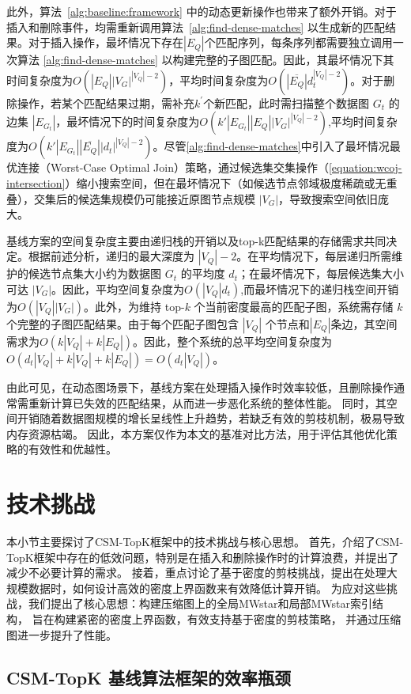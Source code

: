 此外，算法~\ref{alg:baseline:framework} 中的动态更新操作也带来了额外开销。对于插入和删除事件，均需重新调用算法~\ref{alg:find-dense-matches} 以生成新的匹配结果。对于插入操作，最坏情况下存在$|E_Q|$个匹配序列，每条序列都需要独立调用一次算法 \ref{alg:find-dense-matches} 以构建完整的子图匹配。因此，其最坏情况下其时间复杂度为$O(|E_Q||V_G|^{|V_Q|-2})$，平均时间复杂度为$O(|\overline{E_Q}|d_t^{|V_Q|-2})$。对于删除操作，若某个匹配结果过期，需补充$k^{\prime}$个新匹配，此时需扫描整个数据图 $G_t$ 的边集 $|E_{G_t}|$，最坏情况下的时间复杂度为$O(k' |E_{G_t}|  |E_Q|  |V_G|^{|V_Q|-2})$,平均时间复杂度为$O(k' |E_{G_t}|  |\overline{E_Q}| |d_t|^{|V_Q|-2})$。尽管\ref{alg:find-dense-matches}中引入了最坏情况最优连接（Worst-Case Optimal Join）策略，通过候选集交集操作（\ref{equation:wcoj-intersection}）缩小搜索空间，但在最坏情况下（如候选节点邻域极度稀疏或无重叠），交集后的候选集规模仍可能接近原图节点规模 $|V_G|$，导致搜索空间依旧庞大。

基线方案的空间复杂度主要由递归栈的开销以及top-k匹配结果的存储需求共同决定。根据前述分析，递归的最大深度为 $|V_Q| - 2$。在平均情况下，每层递归所需维护的候选节点集大小约为数据图 $G_t$ 的平均度 $d_t$；在最坏情况下，每层候选集大小可达 $|V_G|$。因此，平均空间复杂度为$O(|V_Q|d_t)$,而最坏情况下的递归栈空间开销为$O(|V_Q||V_G|)$。此外，为维持 top-$k$ 个当前密度最高的匹配子图，系统需存储 $k$ 个完整的子图匹配结果。由于每个匹配子图包含 $|V_Q|$ 个节点和$|E_Q|$条边，其空间需求为$O(k|V_Q|+k|E_Q|)$。因此，整个系统的总平均空间复杂度为$O(d_t|V_Q|+k|V_Q|+k|E_Q|)=O(d_t|V_Q|)$。

由此可见，在动态图场景下，基线方案在处理插入操作时效率较低，且删除操作通常需重新计算已失效的匹配结果，从而进一步恶化系统的整体性能。
同时，其空间开销随着数据图规模的增长呈线性上升趋势，若缺乏有效的剪枝机制，极易导致内存资源枯竭。
因此，本方案仅作为本文的基准对比方法，用于评估其他优化策略的有效性和优越性。




\section{技术挑战}
本小节主要探讨了CSM-TopK框架中的技术挑战与核心思想。
首先，介绍了CSM-TopK框架中存在的低效问题，特别是在插入和删除操作时的计算浪费，并提出了减少不必要计算的需求。
接着，重点讨论了基于密度的剪枝挑战，提出在处理大规模数据时，如何设计高效的密度上界函数来有效降低计算开销。
为应对这些挑战，我们提出了核心思想：构建压缩图上的全局MWstar和局部MWstar索引结构，  旨在构建紧密的密度上界函数，有效支持基于密度的剪枝策略，
并通过压缩图进一步提升了性能。
\subsection{CSM-TopK 基线算法框架的效率瓶颈}

